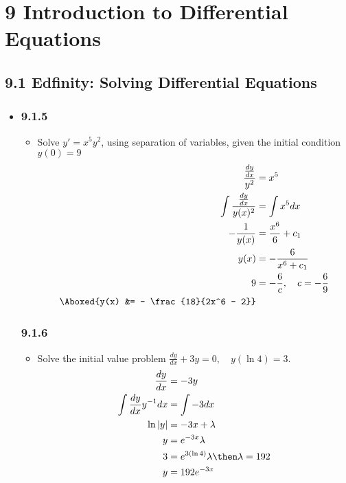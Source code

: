 \chapter{9 Introduction to Differential Equations}
\section{9.1 Edfinity: Solving Differential Equations}
\begin{itemize}
  \item[]

  \subsection{9.1.5}
  \begin{itemize}
    \item Solve \( y' = x^5y^2 \), using separation of variables, given the
      initial condition \( y\left( 0 \right) = 9   \)
      \begin{align*}
        \frac{\frac{dy}{dx}}{y^2} &= x^5\\
        \int \frac{\frac{dy}{dx}}{y(x)^2} &= \int x^5 dx \\
        -\frac{1}{y(x)} &= \frac{x^6}{6} + c_1 \\
        y(x) &= -\frac{6}{x^6 + c_1} \\
        9 &= - \frac{6}{c}, \quad c = -\frac{6}{9} \\
        \Aboxed{y(x) &= - \frac{18}{2x^6 - 2}}
      \end{align*}
  \end{itemize}

  \subsection{9.1.6}
  \begin{itemize}
    \item Solve the initial value problem \( \frac{dy}{dx} + 3y = 0,\quad y(\ln 4) =
      3 \).
    \begin{align*}
      \frac{dy}{dx} &= -3y \\
      \int \frac{dy}{dx} y^{-1}dx &= \int -3dx \\
      \ln|y| &= -3x + \lambda \\
      y &= e^{-3x} \lambda \\
      3 &= e^{3(\ln 4)} \lambda \then \lambda = 192 \\
      y &= 192e^{-3x}
    \end{align*}


\end{itemize}
\end{itemize}
